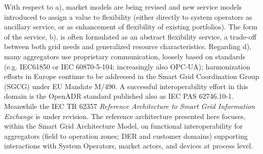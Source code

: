 With respect to a), market models are being revised and new service models introduced to assign a value to flexibility (either directly to system operators as ancillary service, or as enhancement of flexibility of existing portfolios). The form of the service, b), is often formulated as an abstract flexibility service, a trade-off between both grid needs and generalized resource characteristics. Regarding d), many aggregators use proprietary communication, loosely based on standards (e.g. IEC61850 or IEC 60870-5-104; increasingly also OPC-UA); harmonization efforts in Europe continue to be addressed in the Smart Grid Coordination Group (SGCG) under EU Mandate M/490. A successful interoperability effort in this domain is the OpenADR standard published also as IEC PAS 62746.10-1. Meanwhile the IEC TR 62357 \emph{Reference Architecture to Smart Grid Information Exchange} is under revision. The reference architecture presented here focuses, within the Smart Grid Architecture Model, on functional interoperability for aggregators (field to operation zones; DER and customer domains) supporting interactions with System Operators, market actors, and devices at process level.

